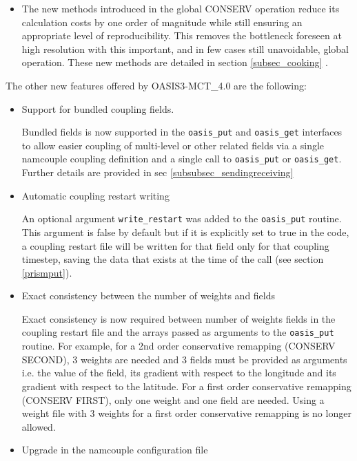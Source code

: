 \begin{itemize}
\item The new methods introduced in the global CONSERV operation reduce its calculation costs by one order of magnitude while still ensuring an appropriate level of reproducibility. This removes the bottleneck foreseen at high resolution with this important, and in few cases still unavoidable, global operation. These new methods are detailed in section \ref{subsec_cooking} .

\end{itemize}

The other new features offered by OASIS3-MCT\_4.0 are the following:

\begin{itemize}

\item Support for bundled coupling fields.

Bundled fields is now supported in the {\tt oasis\_put} and {\tt oasis\_get} interfaces to allow
easier coupling of multi-level or other related fields via a single
namcouple coupling definition and a single call to {\tt oasis\_put} or {\tt oasis\_get}.
Further details are provided in sec \ref{subsubsec_sendingreceiving}

\item Automatic coupling restart writing

An optional argument {\tt write\_restart} was added to the {\tt oasis\_put} routine. This argument is false by default but if it is explicitly set to true in the code, a coupling restart file will be written for that field only for that coupling timestep, saving the data that exists at the time of the call (see section \ref{prismput}).

\item Exact consistency between the number of weights and fields

Exact consistency is now required between number of weights fields in the coupling restart file and the arrays passed as arguments to the {\tt oasis\_put} routine. For example, for a 2nd order conservative remapping (CONSERV SECOND), 3 weights are needed and 3 fields must be provided as arguments i.e. the value of the field, its gradient with respect to the longitude and its gradient with respect to the latitude. For a first order conservative remapping (CONSERV FIRST), only one weight and one field are needed. Using a weight file with 3 weights for a first order conservative remapping is no longer allowed.

\item Upgrade in the namcouple configuration file


\end{itemize}
